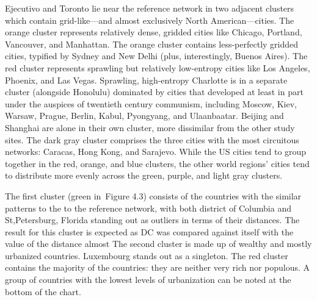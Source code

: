 Ejecutivo and Toronto lie near the reference network in two adjacent clusters which contain grid-like—and almost exclusively North American—cities. The orange cluster represents relatively dense, gridded cities like Chicago, Portland, Vancouver, and Manhattan. The orange cluster contains less-perfectly gridded cities, typified by Sydney and New Delhi (plus, interestingly, Buenos Aires). The red cluster represents sprawling but relatively low-entropy cities like Los Angeles, Phoenix, and Las Vegas. Sprawling, high-entropy Charlotte is in a separate cluster (alongside Honolulu) dominated by cities that developed at least in part under the auspices of twentieth century communism, including Moscow, Kiev, Warsaw, Prague, Berlin, Kabul, Pyongyang, and Ulaanbaatar. Beijing and Shanghai are alone in their own cluster, more dissimilar from the other study sites. The dark gray cluster comprises the three cities with the most circuitous networks: Caracas, Hong Kong, and Sarajevo. While the US cities tend to group together in the red, orange, and blue clusters, the other world regions’ cities tend to distribute more evenly across the green, purple, and light gray clusters.

The first cluster (green in Figure 4.3) consists of the countries with the similar patterns to the to the reference network, with both district of Columbia and St,Petersburg, Florida standing out as outliers in terms of their distances. The result for this cluster is expected as DC was compared against itself with the value of the distance almost 
The second cluster is made up of wealthy and mostly urbanized countries. Luxembourg stands out as a singleton.
The red cluster contains the majority of the countries: they are neither very rich nor populous. A group of countries with the lowest levels of urbanization can be noted at the bottom of the chart.

